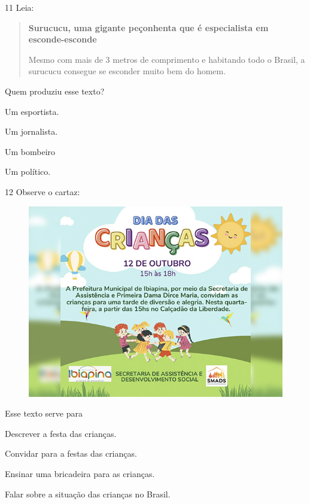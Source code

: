 \num{11} Leia:

\begin{quote}
\textbf{Surucucu, uma gigante peçonhenta que é especialista em esconde-esconde}

Mesmo com mais de 3 metros de comprimento e habitando todo o Brasil, a
surucucu consegue se esconder muito bem do homem.
\end{quote}


Quem produziu esse texto?

\begin{escolha}
\item Um esportista.

\item Um jornalista.

\item Um bombeiro

\item Um político.
\end{escolha}

\num{12} Observe o cartaz:

\begin{figure}[htpb!]
\centering
\includegraphics[width=.5\textwidth]{media/image181.jpeg}
\end{figure}


Esse texto serve para

\begin{escolha}
\item Descrever a festa das crianças.

\item Convidar para a festas das crianças.

\item Ensinar uma bricadeira para as crianças.

\item Falar sobre a situação das crianças no Brasil.
\end{escolha}


